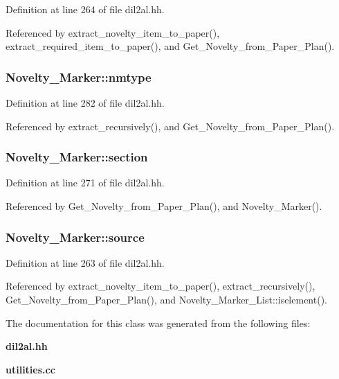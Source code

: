 Definition at line 264 of file dil2al.hh.

Referenced by extract\_\-novelty\_\-item\_\-to\_\-paper(), extract\_\-required\_\-item\_\-to\_\-paper(), and Get\_\-Novelty\_\-from\_\-Paper\_\-Plan().
\subsubsection{ Novelty\_\-Marker::nmtype}\label{classNovelty__Marker_m10}




Definition at line 282 of file dil2al.hh.

Referenced by extract\_\-recursively(), and Get\_\-Novelty\_\-from\_\-Paper\_\-Plan().
\subsubsection{ Novelty\_\-Marker::section}\label{classNovelty__Marker_m8}




Definition at line 271 of file dil2al.hh.

Referenced by Get\_\-Novelty\_\-from\_\-Paper\_\-Plan(), and Novelty\_\-Marker().
\subsubsection{ Novelty\_\-Marker::source}\label{classNovelty__Marker_m1}




Definition at line 263 of file dil2al.hh.

Referenced by extract\_\-novelty\_\-item\_\-to\_\-paper(), extract\_\-recursively(), Get\_\-Novelty\_\-from\_\-Paper\_\-Plan(), and Novelty\_\-Marker\_\-List::iselement().

The documentation for this class was generated from the following files:\begin{CompactItemize}
\item 
{\bf dil2al.hh}\item 
{\bf utilities.cc}\end{CompactItemize}
